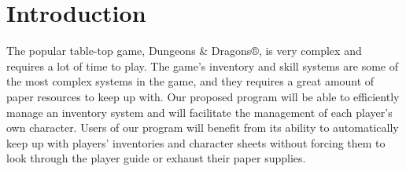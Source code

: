 \documentclass[10pt,conference,onecolumn,compsoc]{IEEEtran}
\begin{document}
\section{Introduction}




% 
% 
% 
% 
The popular table-top game, Dungeons \& Dragons®, is very complex and requires a lot of time to play. The game's inventory and skill systems are some of the most complex systems in the game, and they requires a great amount of paper resources to keep up with. Our proposed program will be able to efficiently manage an inventory system and will facilitate the management of each player's own character. Users of our program will benefit from its ability to automatically keep up with players' inventories and character sheets without forcing them to look through the player guide or exhaust their paper supplies.



\end{document}

